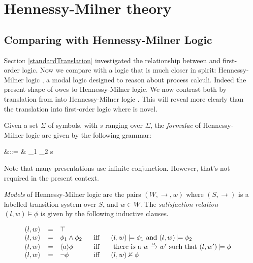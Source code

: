 \section{Hennessy-Milner theory}


\subsection{Comparing \ELABR{} with Hennessy-Milner Logic}

Section \ref{standardTranslation} investigated the relationship
between \ELABR{} and first-order logic. Now we compare \ELABR{} with
a logic that is much closer in spirit: Hennessy-Milner logic
\cite{HennessyM:alglawfndac}, a modal logic designed to reason about
process calculi. Indeed the present shape of \ELABR{} owes to
Hennessy-Milner logic. We now contrast both by translation from \ELABR{} into Hennessy-Milner logic . 
This will reveal more clearly than the translation into
first-order logic where \ELABR{} is novel.

Given a set $\Sigma$ of symbols, with $s$ ranging over
$\Sigma$, the \emph{formulae} of Hennessy-Milner logic are given
by the following grammar:
\begin{GRAMMAR}
  \phi 
     &\quad ::= \quad & 
  \top \fOr \phi_1 \AND \phi_2 \fOr \langle s \rangle \phi \fOr \neg \phi 
\end{GRAMMAR}

\NI Note that many presentations use infinite conjunction. However,
that's not required in the present context.

 \emph{Models} of Hennessy-Milner logic are the pairs $(W,
\rightarrow, w)$ where $(S, \rightarrow)$ is a labelled transition
system over $S$, and $w \in W$.  The \emph{satisfaction relation} $(l,
w) \models \phi$ is given by the following inductive clauses.

\[
\begin{array}{lclcl}
  (l,w) & \models & \top  \\
  (l,w) & \models & \phi_1 \land \phi_2 &\  \mbox{ iff }\  & (l,w)  \models \phi_1 \mbox { and } (l,w) \models \phi_2  \\
  (l,w) & \models & \langle a \rangle \phi & \mbox{ iff } & \mbox{ there is a } w \xrightarrow{a} w' \mbox { such that } (l,w') \models \phi  \\
  (l,w) & \models & \neg \phi & \mbox{ iff } & (l,w)  \nvDash \phi 
\end{array}
\]

